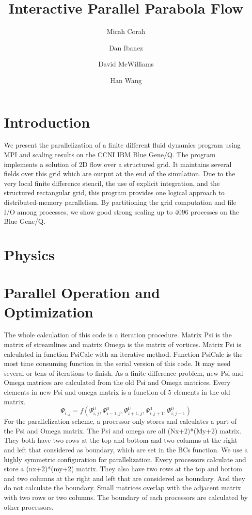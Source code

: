 \documentclass[twocolumn]{article}
\title{Interactive Parallel Parabola Flow}
\author{
Micah Corah
\and
Dan Ibanez
\and
David McWilliams
\and
Han Wang
}
\begin{document}
\maketitle
\section{Introduction}

We present the parallelization of a finite different fluid dynamics
program using MPI and scaling results on the CCNI IBM
Blue Gene/Q.
The program implements a solution of 2D flow over a structured grid.
It maintains several fields over this grid which are output at
the end of the simulation.
Due to the very local finite difference stencil, the use of explicit
integration, and the structured rectangular grid,
this program provides one logical approach to distributed-memory
parallelism.
By partitioning the grid computation
and file I/O among processes, we show
good strong scaling up to 4096 processes on the Blue Gene/Q.

\section{Physics}
\section{Parallel Operation and Optimization}
The whole calculation of this code is a iteration procedure.
Matrix Psi is the matrix of streamlines and matrix Omega is the matrix of vortices.
Matrix Psi is calculated in function PsiCalc with an iterative method.
Function PsiCalc is the most time consuming function in the serial version
of this code.
It may need several or tens of iterations to finish.
As a finite difference problem, new Psi and Omega matrices are calculated from
the old Psi and Omega matrices.
Every elements in new Psi and omega matrix is a function of 5 elements in the old
matrix.
\[\Psi_{i,j}=f(\Psi^0_{i,j},\Psi^0_{i-1,j},\Psi^0_{i+1,j},\Psi^0_{i,j+1},\Psi^0_{i,j-1})\]
For the parallelization scheme, a processor only stores and calculates a part
of the Psi and Omega matrix.
The Psi and omega are all (Nx+2)*(My+2) matrix.
They both have two rows at the top and bottom and two columns at the right
and left that considered as boundary, which are set in the BCs function.
We use a highly symmetric configuration for parallelization.
Every processors calculate and store a (nx+2)*(my+2) matrix.
They also have  two rows at the top and bottom and two columns at the right
and left that are considered as boundary.
And they do not calculate the boundary.
Small matrices  overlap with the adjacent matrix with two rows or two columns.
The boundary of each processors are calculated by other processors.
\end{document}
